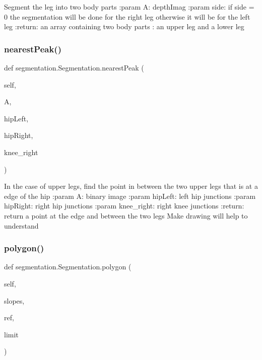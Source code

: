 \begin{DoxyVerb}Segment the leg into two body parts
:param A: depthImag
:param side: if side = 0 the segmentation will be done for the right leg
  otherwise it will be for the left leg
:return: an array containing two body parts : an upper leg and a lower leg
\end{DoxyVerb}
 \mbox{\label{classsegmentation_1_1_segmentation_a887e7665b0fc07dfb964223ef50dc295}} 
\subsubsection{nearest\+Peak()}
{\footnotesize\ttfamily def segmentation.\+Segmentation.\+nearest\+Peak (\begin{DoxyParamCaption}\item[{}]{self,  }\item[{}]{A,  }\item[{}]{hip\+Left,  }\item[{}]{hip\+Right,  }\item[{}]{knee\+\_\+right }\end{DoxyParamCaption})}

\begin{DoxyVerb}In the case of upper legs, find the point in between the two upper legs that is at a edge of the hip
:param A: binary image
:param hipLeft: left hip junctions
:param hipRight:  right hip junctions
:param knee_right: right knee junctions
:return: return a point at the edge and between the two legs
Make drawing will help to understand
\end{DoxyVerb}
 \mbox{\label{classsegmentation_1_1_segmentation_abbd3c1929edf660b23d908a99e2775ab}} 
\subsubsection{polygon()}
{\footnotesize\ttfamily def segmentation.\+Segmentation.\+polygon (\begin{DoxyParamCaption}\item[{}]{self,  }\item[{}]{slopes,  }\item[{}]{ref,  }\item[{}]{limit }\end{DoxyParamCaption})}

